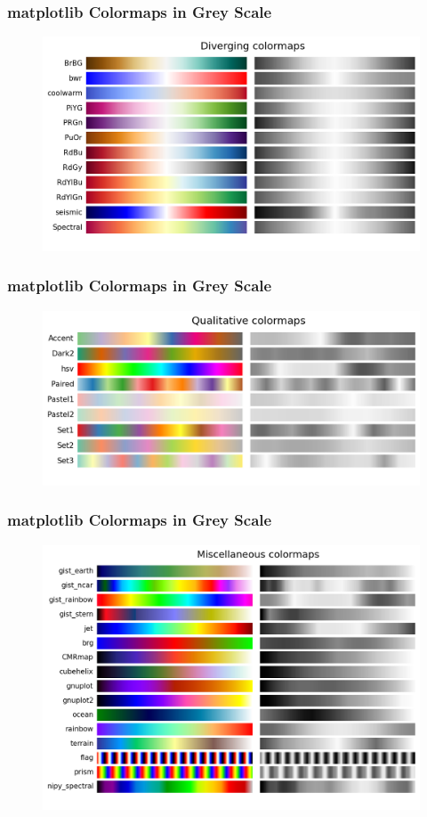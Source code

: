 \documentclass[ignorenonframetext]{beamer}
\begin{document}
\begin{frame}[t,noframenumbering]\frametitle{matplotlib Colormaps in Grey Scale}
    \begin{figure}[htbp]
        \centering
        \includegraphics[width=\textwidth]{figures/bwDiverging}
    \end{figure}
\end{frame}
\begin{frame}[t,noframenumbering]\frametitle{matplotlib Colormaps in Grey Scale}
    \begin{figure}[htbp]
        \centering
        \includegraphics[width=\textwidth]{figures/bwQualitative}
    \end{figure}
\end{frame}
\begin{frame}[t,noframenumbering]\frametitle{matplotlib Colormaps in Grey Scale}
    \begin{figure}[htbp]
        \centering
        \includegraphics[width=\textwidth]{figures/bwMiscellaneous}
    \end{figure}
\end{frame}
\end{document}
